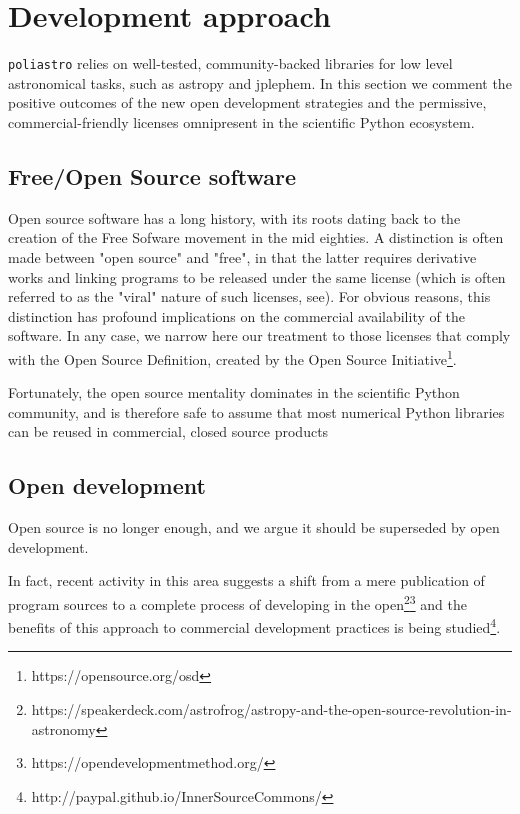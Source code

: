 \section{Development approach}
\label{sec:development}

\verb|poliastro| relies on well-tested, community-backed libraries for low level astronomical tasks, such as astropy\cite{Robitaille2013} and jplephem. In this section we comment the positive outcomes of the new open development strategies and the permissive, commercial-friendly licenses omnipresent in the scientific Python ecosystem.

\subsection{Free/Open Source software}

Open source software has a long history, with its roots dating back to the creation of the Free Sofware movement in the mid eighties\cite{Stallman:1985:GM}. A distinction is often made between "open source" and "free", in that the latter requires derivative works and linking programs to be released under the same license (which is often referred to as the "viral" nature of such licenses, see\cite{stallman2009viewpoint}). For obvious reasons, this distinction has profound implications on the commercial availability of the software. In any case, we narrow here our treatment to those licenses that comply with the Open Source Definition, created by the Open Source Initiative\footnote{https://opensource.org/osd}.


Fortunately, the open source mentality dominates in the scientific Python community, and is therefore safe to assume that most numerical Python libraries can be reused in commercial, closed source products%

\subsection{Open development}

Open source is no longer enough, and we argue it should be superseded by open development.

In fact, recent activity in this area suggests a shift from a mere publication of program sources to a complete process of developing in the open\footnote{https://speakerdeck.com/astrofrog/astropy-and-the-open-source-revolution-in-astronomy}\footnote{https://opendevelopmentmethod.org/} and the benefits of this approach to commercial development practices is being studied\footnote{http://paypal.github.io/InnerSourceCommons/}.
